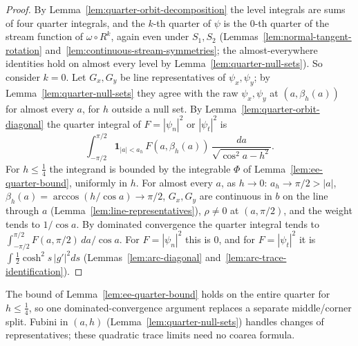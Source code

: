 \begin{proof}
\leanok
By Lemma~\ref{lem:quarter-orbit-decomposition} the level integrals are sums of four quarter
integrals, and the $k$-th quarter of $\psi$ is the $0$-th quarter of the stream function of
$\omega\circ R^k$, again even under $S_1,S_2$ (Lemmas~\ref{lem:normal-tangent-rotation}
and~\ref{lem:continuous-stream-symmetries}; the almost-everywhere identities hold on almost
every level by Lemma~\ref{lem:quarter-null-sets}). So consider $k=0$. Let $G_x,G_y$ be line
representatives of $\psi_x,\psi_y$; by Lemma~\ref{lem:quarter-null-sets} they agree with the raw
$\psi_x,\psi_y$ at $(a,\beta_h(a))$ for almost every $a$, for $h$ outside a null set. By
Lemma~\ref{lem:quarter-orbit-diagonal} the quarter integral of $F=|\psi_n|^2$ or $|\psi_t|^2$ is
\[
  \int_{-\pi/2}^{\pi/2}\mathbf 1_{|a|<a_h}\,F(a,\beta_h(a))\,\frac{da}{\sqrt{\cos^2a-h^2}} .
\]
For $h\le\frac14$ the integrand is bounded by the integrable $\Phi$ of
Lemma~\ref{lem:ee-quarter-bound}, uniformly in $h$. For almost every $a$, as $h\to0$:
$a_h\to\pi/2>|a|$, $\beta_h(a)=\arccos(h/\cos a)\to\pi/2$, $G_x,G_y$ are continuous in $b$ on the
line through $a$ (Lemma~\ref{lem:line-representatives}), $\rho\ne0$ at $(a,\pi/2)$, and the weight
tends to $1/\cos a$. By dominated convergence the quarter integral tends to
$\int_{-\pi/2}^{\pi/2}F(a,\pi/2)\,da/\cos a$. For $F=|\psi_n|^2$ this is $0$, and for
$F=|\psi_t|^2$ it is $\int\frac12\cosh^2s\,|g'|^2ds$ (Lemmas~\ref{lem:arc-diagonal}
and~\ref{lem:arc-trace-identification}).
\end{proof}

\begin{remark}
The bound of Lemma~\ref{lem:ee-quarter-bound} holds on the entire quarter
for $h\le\frac14$, so one dominated-convergence argument replaces a
separate middle/corner split. Fubini in $(a,h)$
(Lemma~\ref{lem:quarter-null-sets}) handles changes of representatives;
these quadratic trace limits need no coarea formula.
\end{remark}


